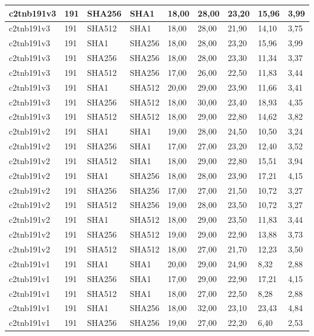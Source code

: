 \begin{longtable}{| l | l | l | l | l |l |l |l |l |}
c2tnb191v3 & 191 & SHA256 & SHA1 & 18,00 & 28,00 & 23,20 & 15,96 & 3,99 \\ \hline 
c2tnb191v3 & 191 & SHA512 & SHA1 & 18,00 & 28,00 & 21,90 & 14,10 & 3,75 \\ \hline 
c2tnb191v3 & 191 & SHA1 & SHA256 & 18,00 & 28,00 & 23,20 & 15,96 & 3,99 \\ \hline 
c2tnb191v3 & 191 & SHA256 & SHA256 & 18,00 & 28,00 & 23,30 & 11,34 & 3,37 \\ \hline 
c2tnb191v3 & 191 & SHA512 & SHA256 & 17,00 & 26,00 & 22,50 & 11,83 & 3,44 \\ \hline 
c2tnb191v3 & 191 & SHA1 & SHA512 & 20,00 & 29,00 & 23,90 & 11,66 & 3,41 \\ \hline 
c2tnb191v3 & 191 & SHA256 & SHA512 & 18,00 & 30,00 & 23,40 & 18,93 & 4,35 \\ \hline 
c2tnb191v3 & 191 & SHA512 & SHA512 & 18,00 & 29,00 & 22,80 & 14,62 & 3,82 \\ \hline 
c2tnb191v2 & 191 & SHA1 & SHA1 & 19,00 & 28,00 & 24,50 & 10,50 & 3,24 \\ \hline 
c2tnb191v2 & 191 & SHA256 & SHA1 & 17,00 & 27,00 & 23,20 & 12,40 & 3,52 \\ \hline 
c2tnb191v2 & 191 & SHA512 & SHA1 & 18,00 & 29,00 & 22,80 & 15,51 & 3,94 \\ \hline 
c2tnb191v2 & 191 & SHA1 & SHA256 & 18,00 & 28,00 & 23,90 & 17,21 & 4,15 \\ \hline 
c2tnb191v2 & 191 & SHA256 & SHA256 & 17,00 & 27,00 & 21,50 & 10,72 & 3,27 \\ \hline 
c2tnb191v2 & 191 & SHA512 & SHA256 & 19,00 & 28,00 & 23,50 & 10,72 & 3,27 \\ \hline 
c2tnb191v2 & 191 & SHA1 & SHA512 & 18,00 & 29,00 & 23,50 & 11,83 & 3,44 \\ \hline 
c2tnb191v2 & 191 & SHA256 & SHA512 & 19,00 & 29,00 & 22,90 & 13,88 & 3,73 \\ \hline 
c2tnb191v2 & 191 & SHA512 & SHA512 & 18,00 & 27,00 & 21,70 & 12,23 & 3,50 \\ \hline 
c2tnb191v1 & 191 & SHA1 & SHA1 & 20,00 & 29,00 & 24,90 & 8,32 & 2,88 \\ \hline 
c2tnb191v1 & 191 & SHA256 & SHA1 & 17,00 & 29,00 & 22,90 & 17,21 & 4,15 \\ \hline 
c2tnb191v1 & 191 & SHA512 & SHA1 & 18,00 & 27,00 & 22,50 & 8,28 & 2,88 \\ \hline 
c2tnb191v1 & 191 & SHA1 & SHA256 & 18,00 & 32,00 & 23,10 & 23,43 & 4,84 \\ \hline 
c2tnb191v1 & 191 & SHA256 & SHA256 & 19,00 & 27,00 & 22,20 & 6,40 & 2,53 \\ \hline 

\end{longtable}
